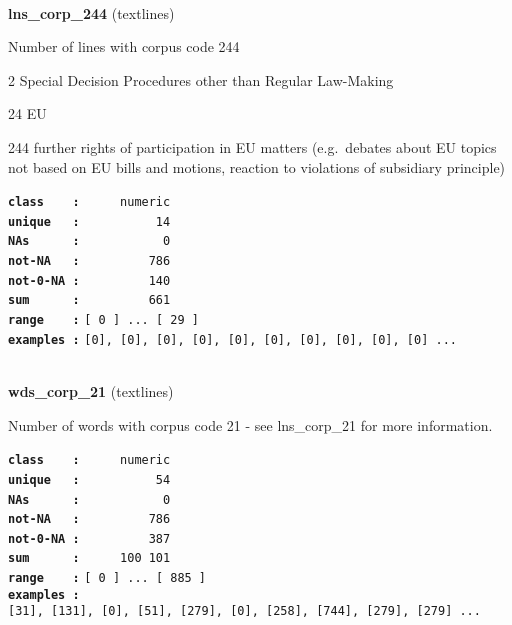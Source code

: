 \documentclass[]{article}
\begin{document}
~

\textbf{lns\_corp\_244} (textlines)

Number of lines with corpus code 244

2 Special Decision Procedures other than Regular Law-Making

24 EU

244 further rights of participation in EU matters (e.g.~debates about EU
topics not based on EU bills and motions, reaction to violations of
subsidiary principle)

\textbf{\texttt{class\ \ \ \ :}} \texttt{~~~~~numeric}\\
\textbf{\texttt{unique\ \ \ :}} \texttt{~~~~~~~~~~14}\\
\textbf{\texttt{NAs\ \ \ \ \ \ :}} \texttt{~~~~~~~~~~~0}\\
\textbf{\texttt{not-NA\ \ \ :}} \texttt{~~~~~~~~~786}\\
\textbf{\texttt{not-0-NA\ :}} \texttt{~~~~~~~~~140}\\
\textbf{\texttt{sum\ \ \ \ \ \ :}} \texttt{~~~~~~~~~661}\\
\textbf{\texttt{range\ \ \ \ :}}
\texttt{{[}\ 0\ {]}\ ...\ {[}\ 29\ {]}}\\
\textbf{\texttt{examples\ :}}
\texttt{{[}0{]},\ {[}0{]},\ {[}0{]},\ {[}0{]},\ {[}0{]},\ {[}0{]},\ {[}0{]},\ {[}0{]},\ {[}0{]},\ {[}0{]}\ ...}\\

~

\textbf{wds\_corp\_21} (textlines)

Number of words with corpus code 21 - see lns\_corp\_21 for more
information.

\textbf{\texttt{class\ \ \ \ :}} \texttt{~~~~~numeric}\\
\textbf{\texttt{unique\ \ \ :}} \texttt{~~~~~~~~~~54}\\
\textbf{\texttt{NAs\ \ \ \ \ \ :}} \texttt{~~~~~~~~~~~0}\\
\textbf{\texttt{not-NA\ \ \ :}} \texttt{~~~~~~~~~786}\\
\textbf{\texttt{not-0-NA\ :}} \texttt{~~~~~~~~~387}\\
\textbf{\texttt{sum\ \ \ \ \ \ :}} \texttt{~~~~~100~101}\\
\textbf{\texttt{range\ \ \ \ :}}
\texttt{{[}\ 0\ {]}\ ...\ {[}\ 885\ {]}}\\
\textbf{\texttt{examples\ :}}
\texttt{{[}31{]},\ {[}131{]},\ {[}0{]},\ {[}51{]},\ {[}279{]},\ {[}0{]},\ {[}258{]},\ {[}744{]},\ {[}279{]},\ {[}279{]}\ ...}\\
\end{document}
